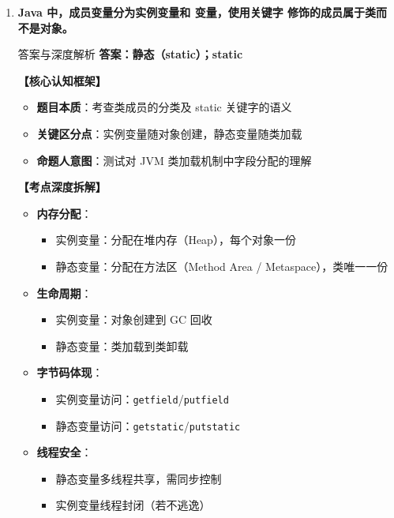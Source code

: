 \documentclass[12pt, a4paper]{ctexart}
\newcommand{\code}[1]{\texttt{#1}}
\newcommand{\blank}{\underline{\hspace{2em}}}
\begin{document}
\begin{enumerate}[label=\textbf{\arabic*.}, leftmargin=*, itemsep=1.5em]
	\item \textbf{Java 中，成员变量分为实例变量和 \blank 变量，使用关键字 \blank 修饰的成员属于类而不是对象。}
	      \begin{bluebox}{答案与深度解析}
		      \textbf{答案：静态（static）；static}

		      \textbf{【核心认知框架】}
		      \begin{itemize}[leftmargin=*, nosep]
			      \item \textbf{题目本质}：考查类成员的分类及 static 关键字的语义
			      \item \textbf{关键区分点}：实例变量随对象创建，静态变量随类加载
			      \item \textbf{命题人意图}：测试对 JVM 类加载机制中字段分配的理解
		      \end{itemize}

		      \textbf{【考点深度拆解】}
		      \begin{itemize}[leftmargin=*, nosep]
			      \item \textbf{内存分配}：
			            \begin{itemize}
				            \item 实例变量：分配在堆内存（Heap），每个对象一份
				            \item 静态变量：分配在方法区（Method Area / Metaspace），类唯一一份
			            \end{itemize}
			      \item \textbf{生命周期}：
			            \begin{itemize}
				            \item 实例变量：对象创建到 GC 回收
				            \item 静态变量：类加载到类卸载
			            \end{itemize}
			      \item \textbf{字节码体现}：
			            \begin{itemize}
				            \item 实例变量访问：\code{getfield}/\code{putfield}
				            \item 静态变量访问：\code{getstatic}/\code{putstatic}
			            \end{itemize}
			      \item \textbf{线程安全}：
			            \begin{itemize}
				            \item 静态变量多线程共享，需同步控制
				            \item 实例变量线程封闭（若不逃逸）
			            \end{itemize}
		      \end{itemize}


\end{bluebox}
\end{enumerate}
\end{document}
